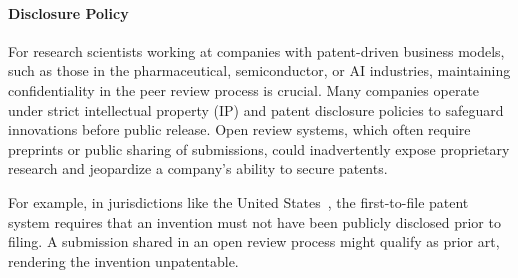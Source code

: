 


\paragraph{Disclosure Policy}

For research scientists working at companies with patent-driven business models, such as those in the pharmaceutical, semiconductor, or AI industries, maintaining confidentiality in the peer review process is crucial. Many companies operate under strict intellectual property (IP) and patent disclosure policies to safeguard innovations before public release. Open review systems, which often require preprints or public sharing of submissions, could inadvertently expose proprietary research and jeopardize a company’s ability to secure patents.

For example, in jurisdictions like the United States~\cite{uspto2013patent}, the first-to-file patent system requires that an invention must not have been publicly disclosed prior to filing. A submission shared in an open review process might qualify as prior art, rendering the invention unpatentable. 

